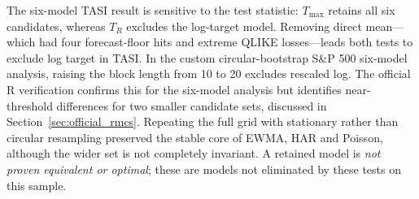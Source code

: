 \begin{table}[ht]
\centering\small
\caption{Independently reproduced 2026 MCS results (circular bootstrap, block 10;
4,999 replicates). Retained-model lists are ordered alphabetically.}\label{tab:indmcs}
\end{table}

The six-model TASI result is sensitive to the test statistic: $T_{\max}$
retains all six candidates, whereas $T_R$ excludes the log-target model.
Removing direct mean---which had four forecast-floor hits and extreme
QLIKE losses---leads both tests to exclude log target in TASI. In the custom circular-bootstrap S\&P 500 six-model analysis, raising the block
length from 10 to 20 excludes rescaled log. The official R verification confirms
this for the six-model analysis but identifies near-threshold differences for
two smaller candidate sets, discussed in Section~\ref{sec:official_rmcs}.
Repeating the full grid with stationary rather than circular resampling preserved
the stable core of EWMA, HAR and Poisson, although the wider set is not completely
invariant. A retained model is \emph{not proven equivalent or optimal}; these are
models not eliminated by these tests on this sample.



